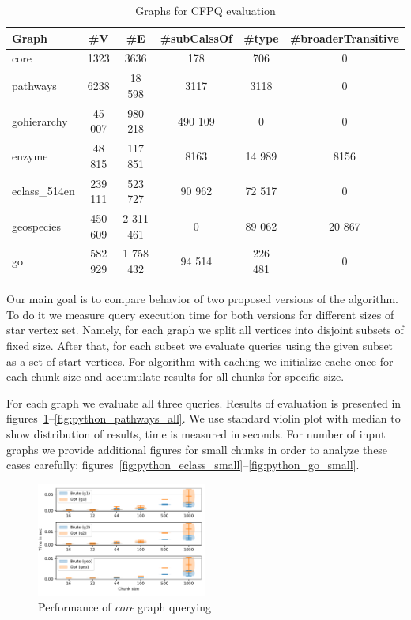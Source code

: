 {\setlength{\tabcolsep}{0.2em}
\begin{table}
{
\caption{Graphs for CFPQ evaluation}
\label{tbl:graphs_for_cfpq}
\small
{}
\begin{tabular}{|l|c|c|c|c|c|}
\hline
Graph          & \#V       & \#E        & \#subCalssOf & \#type &\#broaderTransitive\\
\hline
\hline
core                        & 1323     & 3636       & 178       & 706      & 0      \\
pathways                    & 6238     & 18 598     & 3117      & 3118     & 0      \\
gohierarchy                 & 45 007   & 980 218    & 490 109   & 0        & 0      \\
enzyme                      & 48 815   & 117 851    & 8163      & 14 989   & 8156   \\
eclass\_514en               & 239 111  & 523 727    & 90 962    & 72 517   & 0      \\
geospecies                  & 450 609  & 2 311 461  & 0         & 89 062   & 20 867 \\
go                          & 582 929  & 1 758 432  & 94 514    & 226 481  & 0      \\
\hline
\end{tabular}
}
\end{table}
}


Our main goal is to compare behavior of two proposed versions of the algorithm.
To do it we measure query execution time for both versions for different sizes of star vertex set.
Namely, for each graph we split all vertices into disjoint subsets of fixed size.
After that, for each subset we evaluate queries using the given subset as a set of start vertices.
For algorithm with caching we initialize cache once for each chunk size and accumulate results for all chunks for specific size.

For each graph we evaluate all three queries.
Results of evaluation is presented in figures~\ref{fig:python_core_all}--\ref{fig:python_pathways_all}.
We use standard violin plot with median to show distribution of results, time is measured in seconds.
For number of input graphs we provide additional figures for small chunks in order to analyze these cases carefully: figures~\ref{fig:python_eclass_small}--\ref{fig:python_go_small}.

\begin{figure}[h]
\centering
\includegraphics[width=0.5\textwidth]{data/raw/core.pdf}
\caption{Performance of \textit{core} graph querying}
\label{fig:python_core_all}
\end{figure}

